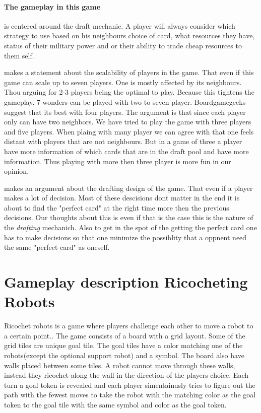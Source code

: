 \documentclass[a4paper]{article}
\begin{document}
\paragraph{The gameplay in this game} is centered around the draft mechanic. A player will always consider which strategy to use based on his neighbours choice of card, what resources they have, status of their military power and or their ability to trade cheap resources to them self. 

\citeauthor{critical7wond} makes a statement about the scalability of players in the game. That even if this game can scale up to seven players. One is mostly affected by its neighbours. Thou arguing for 2-3 players being the optimal to play. Because this tightens the gameplay. 
7 wonders can be played with two to seven player. Boardgamegeeks suggest that its best with four players. The argument is that since each player only can have two neighbors. We have tried to play the game with three players and five players. When plaing with many player we can agree with \citeauthor{critical7wond} that one feels distant with players that are not neighbours. But in a game of three a player have more information of which cards that are in the draft pool and have more information. Thus playing with more then three player is more fun in our opinion.

\citeauthor{opiogamers7wond} makes an argument about the drafting design of the game. That even if a player makes a lot of decision. Most of these descisions dont matter in the end it is about to find the "perfect card" at the right time more then the previous decisions. Our thoughts about this is even if that is the case this is the nature of the \textit{drafting} mechanich. Also to get in the spot of the getting the perfect card one has to make decisions so that one minimize the possiblity that a oppnent need the same "perfect card" as oneself.



\section{Gameplay description Ricocheting Robots}
Ricochet robots is a game where players challenge each other to move a robot to a certain point.. The game consists of a board with a grid layout. Some of the grid tiles are unique goal tile. The goal tiles have a color matching one of the robots(except the optional support robot) and a symbol. The board also have walls placed between some tiles. A robot cannot move through these walls, instead they ricochet along the wall in the direction of the players choice. Each turn a goal token is revealed and each player simentainusly tries to figure out the path with the fewest moves to take the robot with the matching color as the goal token to the goal tile with the same symbol and color as the goal token. 
\end{document}
